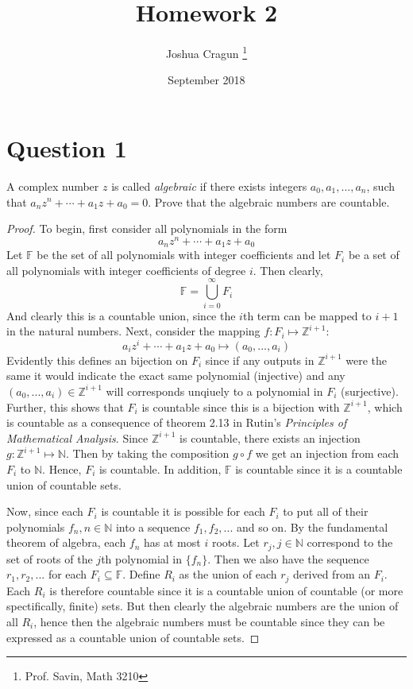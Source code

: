 \documentclass[12pt, letterpaper]{article}
\title{Homework 2}
\author{Joshua Cragun \thanks{Prof. Savin, Math 3210}}
\date{September 2018}
\begin{document}
\begin{titlepage}
\maketitle
\end{titlepage}

\section*{Question 1}
A complex number $z$ is called \textit{algebraic} if there exists integers $a_0, a_1, ..., a_n$,
such that $a_n z^n + \cdots + a_1 z + a_0 = 0$. Prove that the algebraic numbers are countable.

\begin{proof}
  To begin, first consider all polynomials in the form
  $$a_n z^n + \cdots + a_1 z + a_0$$
  Let $\mathbb{F}$ be the set of all polynomials with integer coefficients and let $F_i$ be a set of all polynomials with integer coefficients of degree $i$. Then clearly,
  $$ \mathbb{F} = \bigcup\limits_{i = 0}^{\infty} F_i$$
  And clearly this is a countable union, since the $i$th term can be mapped to $i + 1$ in the natural numbers. Next, consider the mapping $f: F_i \mapsto \mathbb{Z}^{i+1}$:
  $$ a_i z^i + \cdots + a_1 z + a_0 \mapsto (a_0, ..., a_i)$$
  Evidently this defines an bijection on $F_i$ since if any outputs in $\mathbb{Z}^{i+1}$ were the same it would indicate the exact same polynomial (injective)
  and any $(a_0, ..., a_i) \in \mathbb{Z}^{i+1}$ will corresponds unqiuely to a polynomial in $F_i$ (surjective). Further, this shows that $F_i$ is countable
  since this is a bijection with $\mathbb{Z}^{i+1}$, which is countable as a consequence of theorem 2.13 in Rutin's \textit{Principles of Mathematical Analysis}.
  Since $\mathbb{Z}^{i+1}$ is countable, there exists an injection $g : \mathbb{Z}^{i+1} \mapsto \mathbb{N}$.
  Then by taking the composition $g \circ f$ we get an injection from each $F_i$ to $\mathbb{N}$. Hence, $F_i$ is countable.
  In addition, $\mathbb{F}$ is countable since it is a countable union of countable sets.

  Now, since each $F_i$ is countable it is possible for each $F_i$ to put all of their polynomials $f_n, n \in \mathbb{N}$ into a sequence $f_1, f_2, ...$ and so on.
  By the fundamental theorem of algebra, each $f_n$ has at most $i$ roots. Let $r_j, j \in \mathbb{N}$ correspond to the set of roots of the $j$th polynomial in $\{f_n\}$.
  Then we also have the sequence $r_1, r_2, ...$ for each $F_i \subseteq \mathbb{F}$. Define $R_i$ as the union of each $r_j$ derived from an $F_i$. Each $R_i$ is therefore
  countable since it is a countable union of countable (or more spectifically, finite) sets. But then clearly the algebraic numbers are the union of all $R_i$, hence then
  the algebraic numbers must be countable since they can be expressed as a countable union of countable sets.

\end{proof}
\end{document}
